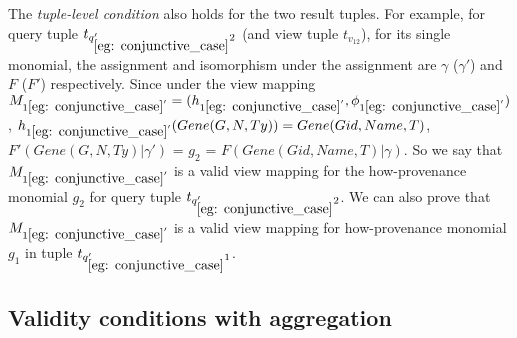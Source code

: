\begin{example}
The {\em tuple-level condition} also holds for the two result tuples. For example, for query tuple $t_{q_{\ref{eg: conjunctive_case}}'2}$ (and view tuple $t_{v_12}$), for its single monomial, the assignment and isomorphism under the assignment are $\gamma$ ($\gamma'$) and $F$ ($F'$) respectively. Since under the view mapping $M_{1\ref{eg: conjunctive_case}'}=(h_{1\ref{eg: conjunctive_case}'}, \phi_{1\ref{eg: conjunctive_case}'})$, $h_{1\ref{eg: conjunctive_case}'}(Gene(G, N, Ty)) = Gene(Gid, Name, T)$, \\
$F'(Gene(G, N, Ty)|\gamma')$ = $g_2$ = $F(Gene(Gid, Name, T)| \gamma)$. So we say that $M_{1\ref{eg: conjunctive_case}'}$ is a valid view mapping for the how-provenance monomial $g_2$ for query tuple $t_{q_{\ref{eg: conjunctive_case}}'2}$. We can also prove that $M_{1\ref{eg: conjunctive_case}'}$ is a valid view mapping for how-provenance monomial $g_1$ in tuple $t_{q_{\ref{eg: conjunctive_case}}'1}$.



\end{example}



\subsection{Validity conditions with aggregation}\label{valid_condition_agg}

